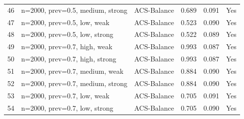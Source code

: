 \begin{tabular}{rlllll}
46 & n=2000, prev=0.5, medium, strong & ACS-Balance & 0.689 & 0.091 & Yes \\
47 & n=2000, prev=0.5, low, weak & ACS-Balance & 0.523 & 0.090 & Yes \\
48 & n=2000, prev=0.5, low, strong & ACS-Balance & 0.522 & 0.089 & Yes \\
49 & n=2000, prev=0.7, high, weak & ACS-Balance & 0.993 & 0.087 & Yes \\
50 & n=2000, prev=0.7, high, strong & ACS-Balance & 0.993 & 0.087 & Yes \\
51 & n=2000, prev=0.7, medium, weak & ACS-Balance & 0.884 & 0.090 & Yes \\
52 & n=2000, prev=0.7, medium, strong & ACS-Balance & 0.884 & 0.090 & Yes \\
53 & n=2000, prev=0.7, low, weak & ACS-Balance & 0.705 & 0.091 & Yes \\
54 & n=2000, prev=0.7, low, strong & ACS-Balance & 0.705 & 0.090 & Yes \\
\bottomrule
\end{tabular}
